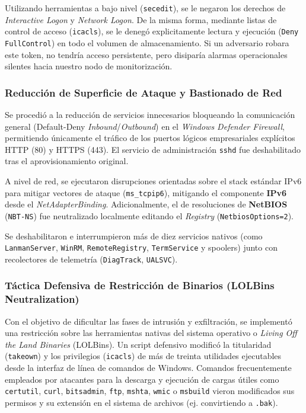 Utilizando herramientas a bajo nivel (\texttt{secedit}), se le negaron los derechos de \textit{Interactive Logon} y \textit{Network Logon}. De la misma forma, mediante listas de control de acceso (\texttt{icacls}), se le denegó explicitamente lectura y ejecución (\texttt{Deny} \texttt{Full}\allowbreak\texttt{Control}) en todo el volumen de almacenamiento. Si un adversario robara este token, no tendría acceso persistente, pero disiparía alarmas operacionales silentes hacia nuestro nodo de monitorización.

\subsubsection{Reducción de Superficie de Ataque y Bastionado de Red}
Se procedió a la reducción de servicios innecesarios bloqueando la comunicación general (Default-Deny \textit{Inbound}/\textit{Outbound}) en el \textit{Windows Defender Firewall}, permitiendo únicamente el tráfico de los puertos lógicos empresariales explícitos HTTP (80) y HTTPS (443). El servicio de administración \texttt{sshd} fue deshabilitado tras el aprovisionamiento original.

A nivel de red, se ejecutaron disrupciones orientadas sobre el stack estándar IPv6 para mitigar vectores de ataque (\texttt{ms\_tcpip6}), mitigando el componente \textbf{IPv6} desde el \textit{NetAdapterBinding}. Adicionalmente, el de resoluciones de \textbf{NetBIOS} (\texttt{NBT-NS}) fue neutralizado localmente editando el \textit{Registry} (\texttt{Netbios}\allowbreak\texttt{Options=2}).

Se deshabilitaron e interrumpieron más de diez servicios nativos (como \texttt{Lanman}\allowbreak\texttt{Server}, \texttt{WinRM}, \texttt{Remote}\allowbreak\texttt{Registry}, \texttt{Term}\allowbreak\texttt{Service} y spoolers) junto con recolectores de telemetría (\texttt{Diag}\allowbreak\texttt{Track}, \texttt{UAL}\allowbreak\texttt{SVC}).

\subsubsection{Táctica Defensiva de Restricción de Binarios (LOLBins Neutralization)}
Con el objetivo de dificultar las fases de intrusión y exfiltración, se implementó una restricción sobre las herramientas nativas del sistema operativo o \textit{Living Off the Land Binaries} (LOLBins). Un script defensivo modificó la titularidad (\texttt{takeown}) y los privilegios (\texttt{icacls}) de más de treinta utilidades ejecutables desde la interfaz de línea de comandos de Windows. Comandos frecuentemente empleados por atacantes para la descarga y ejecución de cargas útiles como \texttt{certutil}, \allowbreak \texttt{curl}, \allowbreak \texttt{bitsadmin}, \allowbreak \texttt{ftp}, \allowbreak \texttt{mshta}, \allowbreak \texttt{wmic} o \allowbreak \texttt{msbuild} vieron modificados sus permisos y su extensión en el sistema de archivos (ej. convirtiendo a \texttt{.bak}).

